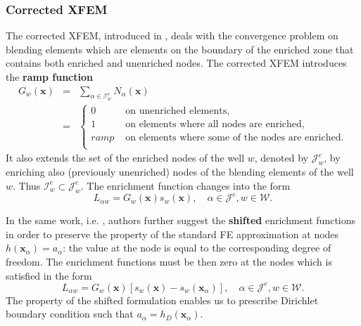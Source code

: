 \documentclass{elsarticle}
\def\vc#1{\mathbf{\boldsymbol{#1}}}     %
\newcommand{\bx}{\vc{x}}
\begin{document}
\subsubsection{Corrected XFEM}
The corrected XFEM, introduced in  \cite{fries_corrected_2008}, deals with the convergence problem on blending elements
which are elements on the boundary of the enriched zone that contains both enriched and unenriched nodes.
The corrected XFEM introduces the \textbf{ramp function}
\begin{eqnarray} \label{eqn:ramp_function}
  G_w(\bx) &=& \sum \limits_{\alpha\in\mathcal{I}_w^e} N_\alpha(\bx)    \\
  &=& 
  \begin{cases}
    0 & \textrm{ on unenriched elements,}    \\
    1 & \textrm{ on elements where all nodes are enriched,}    \\
    ramp & \textrm{ on elements where some of the nodes are enriched.}    \\
  \end{cases} \nonumber
\end{eqnarray}
It also extends the set of the enriched nodes of the well $w$, denoted by $\mathcal{J}^e_w$, by enriching also (previously unenriched) nodes 
of the blending elements of the well $w$. Thus $\mathcal{I}^e_w\subset\mathcal{J}^e_w$.
The enrichment function changes into the form
\begin{equation} \label{eqn:xfem_ramp}
    L_{\alpha w} = G_w(\bx) s_{w}(\bx), \quad \alpha\in\mathcal{J}^e, w\in\mathcal{W}.
\end{equation}


In the same work, i.e. \cite{fries_corrected_2008}, authors further suggest the \textbf{shifted} enrichment functions in order 
to preserve the property of the standard 
FE approximation at nodes $h(\bx_\alpha)=a_\alpha$: the value at the node is equal to the corresponding degree
of freedom. The enrichment functions must be then zero at the nodes which is satisfied in the form
\begin{equation} \label{eqn:xfem_shift}
    L_{\alpha w} = G_w(\bx) \left[s_w(\bx) - s_w(\bx_\alpha)\right],
    \quad \alpha\in\mathcal{J}^e, w\in\mathcal{W}.
\end{equation} 
The property of the shifted formulation enables us to prescribe Dirichlet boundary condition such that
$a_\alpha = h_D(\bx_\alpha)$.
\end{document}
